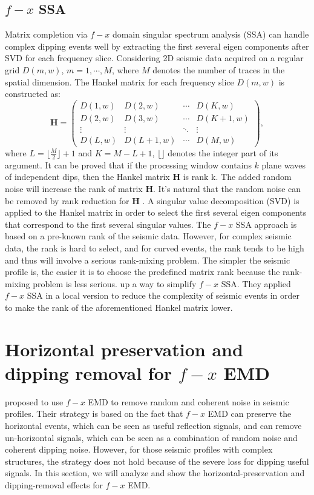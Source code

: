 \subsection{$f-x$ SSA}
Matrix completion via $f-x$ domain singular spectrum analysis (SSA) can handle complex dipping events well by extracting the first several eigen components after SVD for each frequency slice. 
Considering 2D seismic data acquired on a regular grid $D(m,w)$, $m=1,\cdots, M$, where $M$ denotes the number of traces in the spatial dimension.
The Hankel matrix for each frequency slice $D(m,w)$ is constructed as:
\begin{equation}
\label{eq:mssa}
\mathbf{H}=\left(\begin{array}{cccc}
D(1,w) & D(2,w) & \cdots &D(K,w) \\
D(2,w) & D(3,w)  &\cdots &D(K+1,w) \\
\vdots & \vdots &\ddots &\vdots \\
D(L,w)&D(L+1,w) &\cdots&D(M,w)
\end{array}
\right),
\end{equation}
where $L=\lfloor\frac{M}{2}\rfloor+1$ and $K=M-L+1$, $\lfloor\rfloor$ denotes the integer part of its argument. 
It can be proved that if the processing window contains $k$ plane waves of independent dips, then the Hankel matrix $\mathbf{H}$ is rank k. The added random noise will increase the rank of matrix $\mathbf{H}$. It's natural that the random noise can be removed by rank reduction for $\mathbf{H}$ \cite[]{mssa}. A singular value decomposition (SVD) is applied to the Hankel matrix in order to select the first several eigen components that correspond to the first several singular values. The $f-x$ SSA approach is based on a pre-known rank of the seismic data. However, for complex seismic data, the rank is hard to select, and for curved events, the rank tends to be high and thus will involve a serious rank-mixing problem. The simpler the seismic profile is, the easier it is to choose the predefined matrix rank because the rank-mixing problem is less serious. \cite{sanyi2011}  up a way to simplify $f-x$ SSA. They applied $f-x$ SSA in a local version to reduce the complexity of seismic events in order to make the rank of the aforementioned Hankel matrix lower.




\section{Horizontal preservation and dipping removal for $f-x$ EMD}
\cite{bekara} proposed to use $f-x$ EMD to remove random and coherent noise in seismic profiles. Their strategy is based on the fact that $f-x$ EMD can preserve the horizontal events, which can be seen as useful reflection signals, and can remove un-horizontal signals, which can be seen as a combination of random noise and coherent dipping noise. However, for those seismic profiles with complex structures, the strategy does not hold because of the severe loss for dipping useful signals. In this section, we will analyze and show the horizontal-preservation and dipping-removal effects for $f-x$ EMD. 

